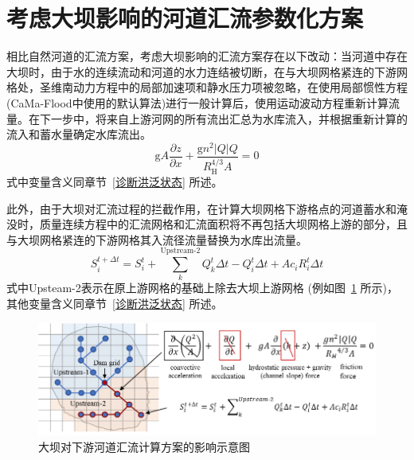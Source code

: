 \section{考虑大坝影响的河道汇流参数化方案}
相比自然河道的汇流方案，考虑大坝影响的汇流方案存在以下改动：当河道中存在大坝时，由于水的连续流动和河道的水力连结被切断，在与大坝网格紧连的下游网格处，圣维南动力方程中的局部加速项和静水压力项被忽略，在使用局部惯性方程(CaMa-Flood中使用的默认算法)进行一般计算后，使用运动波动方程重新计算流量。在下一步中，将来自上游河网的所有流出汇总为水库流入，并根据重新计算的流入和蓄水量确定水库流出。
\begin{equation}
  {\mathrm g} A \frac{\partial z}{\partial x}+\frac{{\mathrm g} n^{2}|Q| Q}{R_{\mathrm{H}}^{4 / 3} A}=0
\end{equation}
式中变量含义同章节~\ref{诊断洪泛状态} 所述。


此外，由于大坝对汇流过程的拦截作用，在计算大坝网格下游格点的河道蓄水和淹没时，质量连续方程中的汇流网格和汇流面积将不再包括大坝网格上游的部分，且与大坝网格紧连的下游网格其入流径流量替换为水库出流量。
\begin{equation}
  S_{i}^{t+\Delta t}=S_{i}^{t}+\sum_{k}^\text{Upstream-2} Q_{k}^{t} \Delta t-Q_{i}^{t} \Delta t+A c_{i} R_{i}^{t} \Delta t
\end{equation}
式中Upsteam-2表示在原上游网格的基础上除去大坝上游网格 (例如图~\ref{fig:大坝对下游河道汇流计算方案的影响示意图} 所示)，其他变量含义同章节~\ref{诊断洪泛状态} 所述。

{
  \begin{figure}[htbp]
    \centering
    \includegraphics{Figures/陆地表面的水分循环/大坝对下游河道汇流计算方案的影响示意图.png}
    \caption{大坝对下游河道汇流计算方案的影响示意图}
    \label{fig:大坝对下游河道汇流计算方案的影响示意图}
  \end{figure}
}

